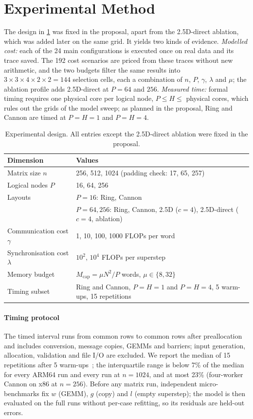 \documentclass[11pt,a4paper]{article}
\begin{document}
\section{Experimental Method}
\label{sec:setup}

The design in \cref{tab:grid} was fixed in the proposal, apart from the 2.5D-direct ablation, which was
added later on the same grid. It yields two kinds of evidence.
\emph{Modelled cost:} each of the 24 main configurations is executed once on real data and its trace
saved. The 192 cost scenarios are priced from these traces without new arithmetic, and the two budgets
filter the same results into $3\times3\times4\times2\times2=144$ selection cells, each a combination of $n$,
$P$, $\gamma$, $\lambda$ and $\mu$; the ablation profile adds 2.5D-direct at $P=64$ and $256$.
\emph{Measured time:} formal timing requires one physical core per logical node, $P\le H\le$ physical
cores, which rules out the grids of the model sweep; as planned in the proposal, Ring and Cannon are timed
at $P=H=1$ and $P=H=4$.

\begin{table}[htb]
\centering
\caption{Experimental design. All entries except the 2.5D-direct ablation were fixed in the proposal.}
\label{tab:grid}
\small
\begin{tabular}{@{}ll@{}}
\toprule
Dimension & Values \\
\midrule
Matrix size $n$ & 256, 512, 1024 (padding check: 17, 65, 257) \\
Logical nodes $P$ & 16, 64, 256 \\
Layouts & $P=16$: Ring, Cannon \\
 & $P=64,256$: Ring, Cannon, 2.5D ($c=4$), 2.5D-direct ($c=4$, ablation) \\
Communication cost $\gamma$ & 1, 10, 100, 1000 FLOPs per word \\
Synchronisation cost $\lambda$ & $10^2$, $10^4$ FLOPs per superstep \\
Memory budget & $M_{\mathrm{cap}}=\mu N^2/P$ words, $\mu\in\{8,32\}$ \\
Timing subset & Ring and Cannon, $P=H=1$ and $P=H=4$, 5 warm-ups, 15 repetitions \\
\bottomrule
\end{tabular}
\end{table}

\paragraph{Timing protocol}
The timed interval runs from common rows to common rows after preallocation and includes conversion,
message copies, GEMMs and barriers; input generation, allocation, validation and file I/O are excluded. We
report the median of 15 repetitions after 5 warm-ups~\cite{hoefler2015}; the interquartile range is below
7\% of the median for every ARM64 run and every run at $n=1024$, and at most 23\% (four-worker Cannon on
x86 at $n=256$). Before any
matrix run, independent micro-benchmarks fix $w$ (GEMM), $g$ (copy) and $l$ (empty superstep); the model is
then evaluated on the full runs without per-case refitting, so its residuals are held-out errors.
\end{document}
